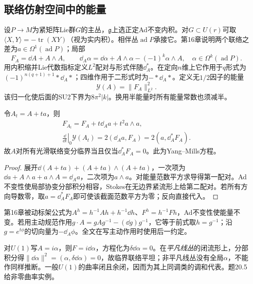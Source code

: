 \subsection{联络仿射空间中的能量}
设$P\to M$为紧矩阵Lie群$G$的主丛，$\mathfrak g$上选正定Ad不变内积。对$G\subset U(r)$可取$\langle X,Y\rangle=-\operatorname{tr}(XY)$（视为实内积）。相伴丛$\operatorname{ad}P$承接它。第16章说明两个联络之差为$a\in\Omega^1(\operatorname{ad}P)$；局部
\[
 F_A=\dd A+A\wedge A,\qquad
 \dd_A\alpha=\dd\alpha+A\wedge\alpha-(-1)^k\alpha\wedge A,
 \quad\alpha\in\Omega^k(\operatorname{ad}P).
\]
用内积缩并Lie代数指标定义$L^2$配对与形式伴随$\dd_A^*$。在定向$n$维上它作用于$q$形式为$(-1)^{n(q+1)+1}*\dd_A*$；四维作用于二形式时为$-*\dd_A*$。定义无$1/2$因子的能量
\begin{equation}\label{eq:ym-energy}
 \mathcal Y(A)=\|F_A\|_{L^2}^2.
\end{equation}
该归一化使后面的SU2下界为$8\pi^2|k|$。换用半能量时所有能量常数也须减半。

\begin{proposition}\label{prop:ym-variation}
令$A_t=A+ta$，则
\begin{gather*}
 F_{A_t}=F_A+t\dd_Aa+t^2a\wedge a,\\
 \left.\frac{\dd}{\dd t}\right|_0\mathcal Y(A_t)
 =2(\dd_Aa,F_A)=2(a,\dd_A^*F_A).
\end{gather*}
故$A$对所有光滑联络变分临界当且仅当$\dd_A^*F_A=0$。此为Yang--Mills方程。
\end{proposition}
\begin{proof}
展开$\dd(A+ta)+(A+ta)\wedge(A+ta)$，一次项为$\dd a+A\wedge a+a\wedge A=\dd_Aa$，二次项为$a\wedge a$。对能量范数平方求导得第一配对。Ad不变性使局部协变分部积分相容，Stokes在无边界紧流形上给第二配对。若所有方向导数零，取$a=\dd_A^*F_A$即可使该截面范数平方为零；反向直接代入。
\end{proof}

第16章被动标架公式为$A^h=h^{-1}Ah+h^{-1}\dd h$、$F^h=h^{-1}Fh$，Ad不变性使能量不变。若用主动规范作用$g\cdot A=gAg^{-1}-(\dd g)g^{-1}$，它等于前式取$h=g^{-1}$；沿$g=e^{t\phi}$的切向量为$-\dd_A\phi$。全文在写主动作用时使用后一约定。

对$U(1)$写$A=i\alpha$，则$F=i\dd\alpha$，方程化为$\delta\dd\alpha=0$。在\emph{平凡线丛}的闭流形上，分部积分得$\|\dd\alpha\|^2=(\alpha,\delta\dd\alpha)=0$，故临界联络平坦；非平凡线丛没有全局$\alpha$，不能作同样推断。一般$U(1)$的曲率闭且余闭，因而为其上同调类的调和代表。题20.5给非零曲率实例。

